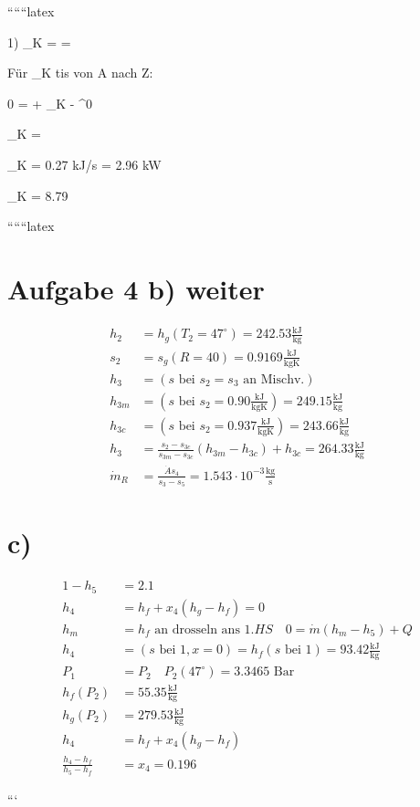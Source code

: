``````latex


1) \quad \epsilon_K =  = 

Für \quad {}_K  \quad tis \quad von \quad A \quad nach \quad Z:

0 =  \cdot [h_1 - h_2] + _K - ^0

_K =  \cdot [h_2 - h_1]

_K = 0.27  \quad kJ/s = 2.96 \quad kW

\epsilon_K = 8.79

``````latex


\section*{Aufgabe 4 b) weiter}

\begin{align*}
h_2 &= h_g(T_2 = 47^\circ) = 242.53 \frac{\text{kJ}}{\text{kg}} \\
s_2 &= s_g(R = 40) = 0.9169 \frac{\text{kJ}}{\text{kgK}} \\
h_3 &= (s \text{ bei } s_2 = s_3 \text{ an } \text{Mischv.}) \\
h_{3m} &= (s \text{ bei } s_2 = 0.90 \frac{\text{kJ}}{\text{kgK}}) = 249.15 \frac{\text{kJ}}{\text{kg}} \\
h_{3c} &= (s \text{ bei } s_2 = 0.937 \frac{\text{kJ}}{\text{kgK}}) = 243.66 \frac{\text{kJ}}{\text{kg}} \\
h_3 &= \frac{s_2 - s_{3c}}{s_{3m} - s_{3c}} (h_{3m} - h_{3c}) + h_{3c} = 264.33 \frac{\text{kJ}}{\text{kg}} \\
\dot{m}_R &= \frac{\dot{A} s_4}{s_3 - s_5} = 1.543 \cdot 10^{-3} \frac{\text{kg}}{\text{s}}
\end{align*}

\section*{c)}

\begin{align*}
1 - h_5 &= 2.1 \\
h_4 &= h_f + x_4 (h_g - h_f) = 0 \\
h_m &= h_f \text{ an } \text{drosseln} \text{ ans } 1. HS \quad 0 = \dot{m} (h_m - h_5) + Q \\
h_4 &= (s \text{ bei } 1, x = 0) = h_f (s \text{ bei } 1) = 93.42 \frac{\text{kJ}}{\text{kg}} \\
P_1 &= P_2 \quad P_2 (47^\circ) = 3.3465 \text{ Bar} \\
h_f (P_2) &= 55.35 \frac{\text{kJ}}{\text{kg}} \\
h_g (P_2) &= 279.53 \frac{\text{kJ}}{\text{kg}} \\
h_4 &= h_f + x_4 (h_g - h_f) \\
\frac{h_4 - h_f}{h_5 - h_f} &= x_4 = 0.196
\end{align*}

```